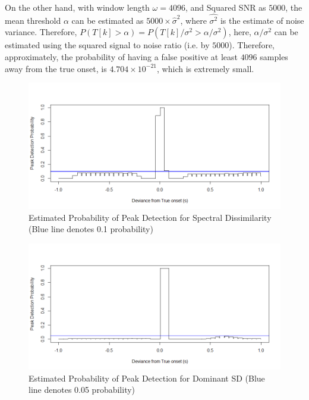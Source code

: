 \documentclass[10pt]{article}
\begin{document}
On the other hand, with window length $\omega = 4096$, and Squared SNR as $5000$, the mean threshold $\alpha$ can be estimated as $5000\times \hat{\sigma}^2$, where $\hat{\sigma^2}$ is the estimate of noise variance. Therefore, $P(T[k] > \alpha) = P(T[k]/\sigma^2 > \alpha/\sigma^2)$, here, $\alpha/\sigma^2$ can be estimated using the squared signal to noise ratio (i.e. by $5000$). Therefore, approximately, the probability of having a false positive at least $4096$ samples away from the true onset, is $4.704\times 10^{-21}$, which is extremely small. 

\begin{figure}
    \centering
    \includegraphics[width = \textwidth]{power_spectral.png}
    \caption{Estimated Probability of Peak Detection for Spectral Dissimilarity (Blue line denotes 0.1 probability)}
    \label{fig:power_spectral}
\end{figure}

\begin{figure}
    \centering
    \includegraphics[width = \textwidth]{power_dfreq.png}
    \caption{Estimated Probability of Peak Detection for Dominant SD (Blue line denotes 0.05 probability)}
    \label{fig:power_dfreq}
\end{figure}
\end{document}
